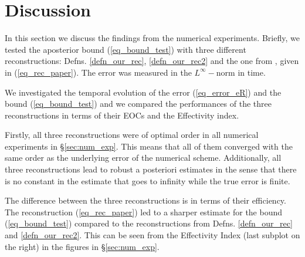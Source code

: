 \documentclass[12pt,a4paper]{article}
\numberwithin{equation}{section}
\theoremstyle{definition}
\begin{document}
\section{Discussion}\label{sec:discussion}
In this section we discuss the findings from the numerical experiments.  Briefly, we tested the aposterior bound (\ref{eq_bound_test}) with three different reconstructions: Defns. \ref{defn_our_rec}, \ref{defn_our_rec2} and the one from \cite{georgoulis2016posteriori}, given in (\ref{eq_rec_paper}).  The error was measured in the $L^{\infty}-$norm in time. 

 We investigated the temporal evolution of the error (\ref{eq_error_eR})  and the bound (\ref{eq_bound_test}) and we compared the performances of the three reconstructions in terms of their EOCs and the Effectivity index.

Firstly,  all three reconstructions were of optimal order in all numerical experiments in \S \ref{sec:num_exp}. This means that all of them converged with the same order as the underlying error of the numerical scheme.  
Additionally, all three reconstructions lead to robust a posteriori estimates in the sense that there is no constant in the estimate that goes to infinity  while the true error is finite.

The difference between the three reconstructions is in terms of their efficiency.  The reconstruction (\ref{eq_rec_paper}) led to a sharper estimate for the bound (\ref{eq_bound_test}) compared to the reconstructions from Defns. \ref{defn_our_rec} and \ref{defn_our_rec2}.  This can be seen from the Effectivity Index (last subplot on the right) in the figures in \S\ref{sec:num_exp}.




\end{document}
